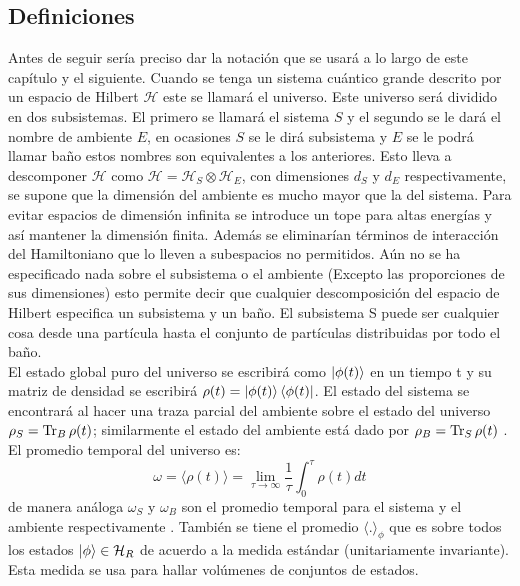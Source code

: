 \subsection{Definiciones}

Antes de seguir sería preciso dar la notación que se usará a lo largo de este capítulo y el siguiente. Cuando se tenga un sistema cuántico grande descrito por un espacio de Hilbert $\mathcal{H}$  este se llamará el universo. Este universo será dividido en  dos subsistemas. El primero se llamará el sistema $S$  y el segundo se le dará el nombre de ambiente $E$, en ocasiones $S$ se le dirá subsistema y $E$ se le podrá llamar baño estos nombres son equivalentes a los anteriores. Esto lleva a descomponer $\mathcal{H}$ como $\mathcal{H}=\mathcal{H}_{S} \otimes \mathcal{H}_{E}$, con dimensiones $d_{S}$ y $d_{E}$ respectivamente, se supone que la dimensión del ambiente es mucho mayor que la del sistema. Para evitar espacios de dimensión infinita se introduce un tope para altas energías y así mantener la dimensión finita. Además se eliminarían términos de interacción del Hamiltoniano que lo lleven a subespacios no permitidos. Aún no se ha especificado nada sobre el subsistema o el ambiente (Excepto las proporciones de sus dimensiones)  esto permite decir que cualquier descomposición del espacio de Hilbert especifica un subsistema y un baño. El subsistema S puede ser cualquier cosa desde una partícula hasta el conjunto de partículas distribuidas por todo el baño.
\\
El estado global puro del universo se escribirá como $\ket{\phi(t)}$ en un tiempo t y su matriz de densidad se escribirá $\rho(t)=\ket{\phi(t)}\bra{\phi(t)}$. El estado del sistema se encontrará al hacer una traza parcial del ambiente sobre el estado del universo $\rho_{S}= \Tr _{B} \rho(t)$; similarmente el estado del ambiente está dado por $\rho_{B}=\Tr _{S} \rho(t)$ \cite{WildeInformation}. El promedio temporal del universo es:
\begin{equation}
\omega= \langle \rho(t) \rangle= \lim_{\tau \to \infty} \frac{1}{\tau} \int_{0}^{\tau} \rho (t)dt
\end{equation}
de manera análoga $\omega_{S}$ y $\omega_{B}$ son el promedio temporal para el sistema y el ambiente respectivamente \cite{TodaStat}. También se tiene el promedio $\langle . \rangle_{\phi}$ que es sobre todos los estados $\ket{\phi} \in \mathcal{H}_{R}$ de acuerdo a la medida estándar (unitariamente invariante). Esta medida se usa para hallar volúmenes de conjuntos de estados.


